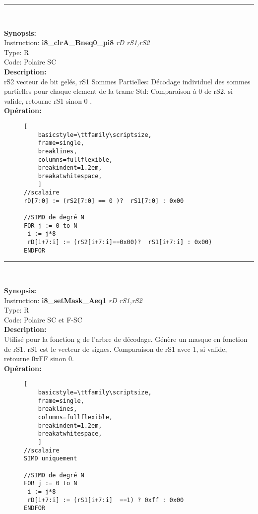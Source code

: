 \rule{8cm}{0.4pt}\\
{\scriptsize
\textbf{Synopsis:}\\
Instruction: \textbf{i8\_clrA\_Bneq0\_pi8 } \textit{rD rS1,rS2}\\
Type: R\\
Code: Polaire SC\\
\textbf{Description:}\\
rS2 vecteur de bit gelés, rS1 Sommes Partielles: Décodage individuel des sommes partielles pour chaque element de la trame
Std: Comparaison à 0 de rS2, si valide, retourne rS1 sinon 0 .\\
\textbf{Opération:}\\
    \begin{figure}[H]
    \begin{lstlisting}[
    basicstyle=\ttfamily\scriptsize,
    frame=single,
    breaklines,
    columns=fullflexible,
    breakindent=1.2em,
    breakatwhitespace,
    ]
//scalaire
rD[7:0] := (rS2[7:0] == 0 )?  rS1[7:0] : 0x00
    
//SIMD de degré N
FOR j := 0 to N    
 i := j*8    
 rD[i+7:i] := (rS2[i+7:i]==0x00)?  rS1[i+7:i] : 0x00) 
ENDFOR
\end{lstlisting}
\end{figure}
}
\rule{8cm}{0.4pt}\\
{\scriptsize
\textbf{Synopsis:}\\
Instruction: \textbf{i8\_setMask\_Aeq1 } \textit{rD rS1,rS2}\\
Type: R\\
Code: Polaire SC et F-SC\\
\textbf{Description:}\\
Utilisé pour la fonction g de l'arbre de décodage. Génère un masque en fonction de rS1. rS1 est le vecteur de signes. 
Comparaison de rS1 avec 1, si valide, retourne 0xFF sinon 0.\\
\textbf{Opération:}\\
    \begin{figure}[H]
    \begin{lstlisting}[
    basicstyle=\ttfamily\scriptsize,
    frame=single,
    breaklines,
    columns=fullflexible,
    breakindent=1.2em,
    breakatwhitespace,
    ]
//scalaire
SIMD uniquement 
    
//SIMD de degré N
FOR j := 0 to N    
 i := j*8    
 rD[i+7:i] := (rS1[i+7:i]  ==1) ? 0xff : 0x00
ENDFOR
\end{lstlisting}
\end{figure}
}
